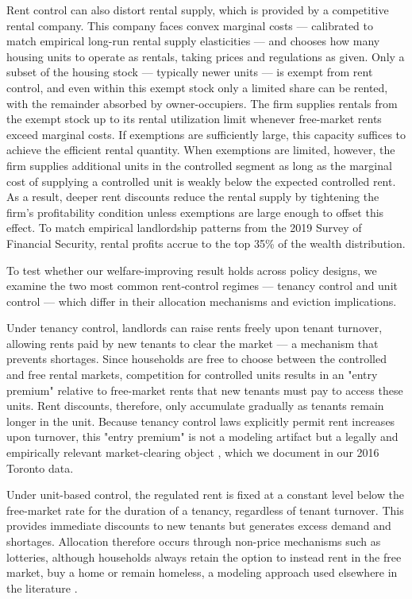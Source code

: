 \documentclass[parskip=full]{article}
\begin{document}
Rent control can also distort rental supply, which is provided by a competitive rental company. This company faces convex marginal costs — calibrated to match empirical long-run rental supply elasticities — and chooses how many housing units to operate as rentals, taking prices and regulations as given. Only a subset of the housing stock — typically newer units — is exempt from rent control, and even within this exempt stock only a limited share can be rented, with the remainder absorbed by owner-occupiers. The firm supplies rentals from the exempt stock up to its rental utilization limit whenever free-market rents exceed marginal costs. If exemptions are sufficiently large, this capacity suffices to achieve the efficient rental quantity. When exemptions are limited, however, the firm supplies additional units in the controlled segment as long as the marginal cost of supplying a controlled unit is weakly below the expected controlled rent. As a result, deeper rent discounts reduce the rental supply by tightening the firm’s profitability condition unless exemptions are large enough to offset this effect. To match empirical landlordship patterns from the 2019 Survey of Financial Security, rental profits accrue to the top 35\% of the wealth distribution. 

To test whether our welfare-improving result holds across policy designs, we examine the two most common rent‑control regimes — tenancy control and unit control — which differ in their allocation mechanisms and eviction implications.

Under tenancy control, landlords can raise rents freely upon tenant turnover, allowing rents paid by new tenants to clear the market — a mechanism that prevents shortages. Since households are free to choose between the controlled and free rental markets, competition for controlled units results in an "entry premium" relative to free-market rents that new tenants must pay to access these units. Rent discounts, therefore, only accumulate gradually as tenants remain longer in the unit. Because tenancy control laws explicitly permit rent increases upon turnover, this "entry premium" is not a modeling artifact but a legally and empirically relevant market-clearing object \citep{arnott-1995}, which we document in our 2016 Toronto data. 

Under unit-based control, the regulated rent is fixed at a constant level below the free-market rate for the duration of a tenancy, regardless of tenant turnover. This provides immediate discounts to new tenants but generates excess demand and shortages. Allocation therefore occurs through non-price mechanisms such as lotteries, although households always retain the option to instead rent in the free market, buy a home or remain homeless, a modeling approach used elsewhere in the literature \citep{fmn-2023}. 
\end{document}
